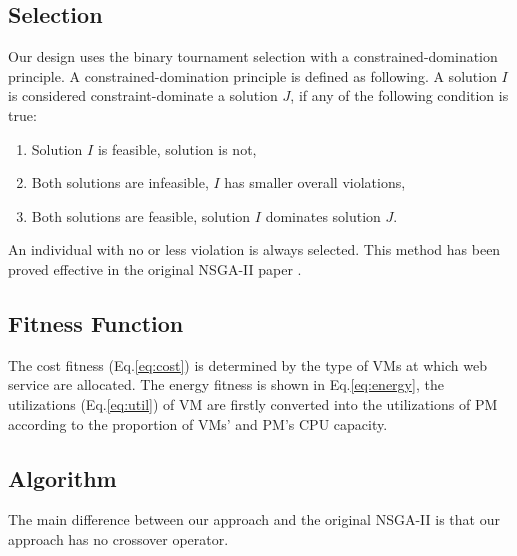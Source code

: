 \subsection{Selection}
Our design uses the binary tournament selection with a constrained-domination principle. A constrained-domination principle is defined as following. A solution $I$ is considered constraint-dominate a solution $J$, if any of the following condition is true:
\begin{enumerate}
  \item Solution $I$ is feasible, solution is not,
  \item Both solutions are infeasible, $I$ has smaller overall
violations,
  \item Both solutions are feasible, solution $I$ dominates solution $J$.
\end{enumerate}

An individual with no or less violation is always selected. This method has been proved effective in the original NSGA-II paper \cite{nsgaii}.

\subsection{Fitness Function}
The cost fitness (Eq.\ref{eq:cost}) is determined by the type of VMs at which web service are allocated. 
The energy fitness is shown in Eq.\ref{eq:energy}, the utilizations (Eq.\ref{eq:util}) of VM are firstly converted into the utilizations of PM according to the proportion of VMs’ and PM’s CPU capacity.

\subsection{Algorithm}
The main difference between our approach and the original NSGA-II is that our approach has no crossover operator.

